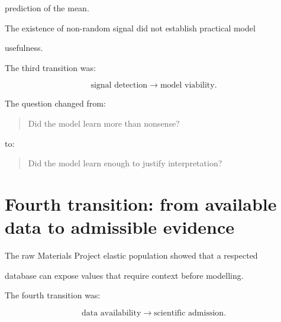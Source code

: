 \documentclass[11pt,a4paper,oneside]{report}
\begin{document}
prediction of the mean.



The existence of non-random signal did not establish practical model

usefulness.



The third transition was:



\begin{equation}
\text{signal detection}
\rightarrow
\text{model viability}.
\end{equation}



The question changed from:



\begin{quote}



Did the model learn more than nonsense?



\end{quote}



to:



\begin{quote}



Did the model learn enough to justify interpretation?



\end{quote}





\section{Fourth transition: from available data to admissible evidence}



The raw Materials Project elastic population showed that a respected

database can expose values that require context before modelling.



The fourth transition was:



\begin{equation}
\text{data availability}
\rightarrow
\text{scientific admission}.
\end{equation}
\end{document}
